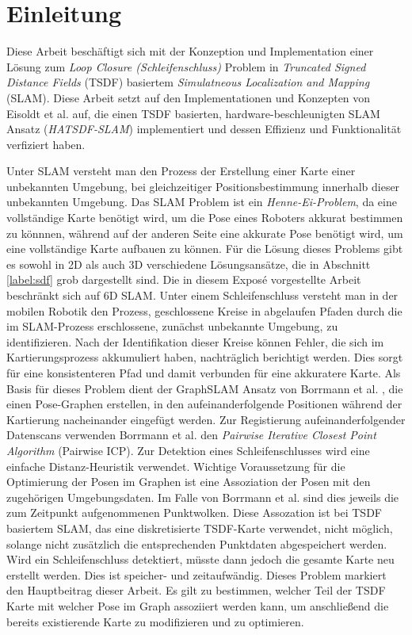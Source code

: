 \chapter{Einleitung}

Diese Arbeit beschäftigt sich mit der Konzeption und Implementation einer Lösung zum \textit{Loop Closure  (Schleifenschluss)} Problem in \textit{Truncated Signed Distance Fields} (TSDF) basiertem \textit{Simulatneous Localization and Mapping} (SLAM).
Diese Arbeit setzt auf den Implementationen und Konzepten von Eisoldt et al. \cite{HATSDF} auf, die einen TSDF basierten, hardware-beschleunigten SLAM Ansatz (\textit{HATSDF-SLAM}) implementiert und dessen Effizienz und Funktionalität verfiziert haben.

Unter SLAM versteht man den Prozess der Erstellung einer Karte einer unbekannten Umgebung, bei gleichzeitiger Positionsbestimmung innerhalb dieser unbekannten Umgebung.
Das SLAM Problem ist ein \textit{Henne-Ei-Problem}, da eine vollständige Karte benötigt wird, um die Pose eines Roboters akkurat bestimmen zu könnnen, während auf der anderen Seite eine akkurate Pose benötigt wird, um eine vollständige Karte aufbauen zu können.
Für die Lösung dieses Problems gibt es sowohl in 2D als auch 3D verschiedene Lösungsansätze, die in Abschnitt \ref{label:sdf} grob dargestellt sind.
Die in diesem Exposé vorgestellte Arbeit beschränkt sich auf 6D SLAM.
Unter einem Schleifenschluss versteht man in der mobilen Robotik den Prozess, geschlossene Kreise in abgelaufen Pfaden durch die im SLAM-Prozess erschlossene, zunächst unbekannte Umgebung, zu identifizieren.
Nach der Identifikation dieser Kreise können Fehler, die sich im Kartierungsprozess akkumuliert haben, nachträglich berichtigt werden. Dies sorgt für eine konsistenteren Pfad und damit verbunden für eine akkuratere Karte.
Als Basis für dieses Problem dient der GraphSLAM Ansatz von Borrmann et al. \cite{borrmann2008globally}, die einen Pose-Graphen erstellen, in den aufeinanderfolgende Positionen während der Kartierung nacheinander eingefügt werden. Zur Registierung aufeinanderfolgender Datenscans verwenden Borrmann et al. den \textit{Pairwise Iterative Closest Point Algorithm} (Pairwise ICP). Zur Detektion eines Schleifenschlusses wird eine einfache Distanz-Heuristik verwendet.
Wichtige Voraussetzung für die Optimierung der Posen im Graphen ist eine Assoziation der Posen mit den zugehörigen Umgebungsdaten. Im Falle von Borrmann et al. sind dies jeweils die zum Zeitpunkt aufgenommenen Punktwolken. Diese Assozation ist bei TSDF basiertem SLAM, das eine diskretisierte TSDF-Karte verwendet, nicht möglich, solange nicht zusätzlich die entsprechenden Punktdaten abgespeichert werden.
Wird ein Schleifenschluss detektiert, müsste dann jedoch die gesamte Karte neu erstellt werden. Dies ist speicher- und zeitaufwändig.
Dieses Problem markiert den Hauptbeitrag dieser Arbeit. Es gilt zu bestimmen, welcher Teil der TSDF Karte mit welcher Pose im Graph assoziiert werden kann, um anschließend die bereits existierende Karte zu modifizieren und zu optimieren.


